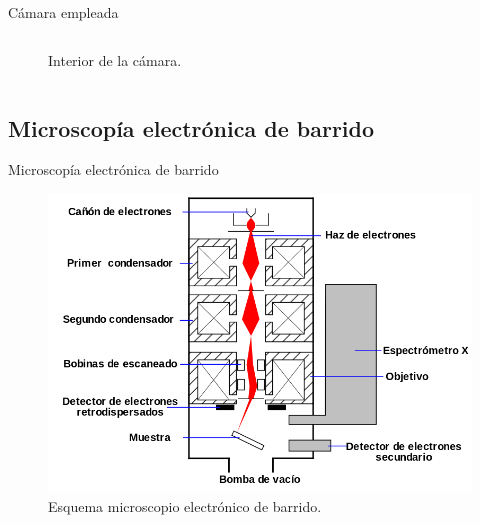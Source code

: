 \documentclass[11pt]{beamer}
\begin{document}
\begin{frame}{Cámara empleada}
\begin{columns}[T]
\begin{column}{.49\textwidth}
\begin{figure}[H]
					\caption*{Interior de la cámara.}					
					\end{figure}
				\end{column}
			\end{columns}
		\end{frame}
	
	\subsection{Microscopía electrónica de barrido}
		\begin{frame}{Microscopía electrónica de barrido}
			\begin{figure}[H]
				\centering
				\includegraphics[scale=0.25]{img/SEM.png}
				\caption*{Esquema microscopio electrónico de barrido.}
			\end{figure}
		\end{frame}
		
\end{document}
